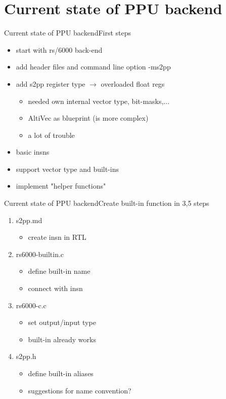 \documentclass[10pt]{beamer}
\begin{document}
\section{Current state of PPU backend}
\begin{frame}{Current state of PPU backend}{First steps}
	\begin{itemize}
		\item start with rs/6000 back-end
		\item add header files and command line option -ms2pp
		\item add s2pp register type $\rightarrow$ overloaded float regs
			\begin{itemize}
				\item needed own internal vector type, bit-masks,...
				\item AltiVec as blueprint (is more complex)
				\item a lot of trouble
			\end{itemize}
		\item basic insns
		\item support vector type and built-ins
		\item implement "helper functions"
	\end{itemize}
\end{frame}

\begin{frame}{Current state of PPU backend}{Create built-in function in 3,5 steps}
	\begin{enumerate}
		\item s2pp.md
		\begin{itemize}
			\item create insn in RTL
		\end{itemize}
		\item rs6000-builtin.c
		\begin{itemize}
			\item define built-in name
			\item connect with insn
		\end{itemize}
		\item rs6000-c.c
		\begin{itemize}
			\item set output/input type
			\item built-in already works
		\end{itemize}
		\item s2pp.h
		\begin{itemize}
			\item define built-in aliases
			\item suggestions for name convention?
		\end{itemize}
	\end{enumerate}
\end{frame}
\end{document}
